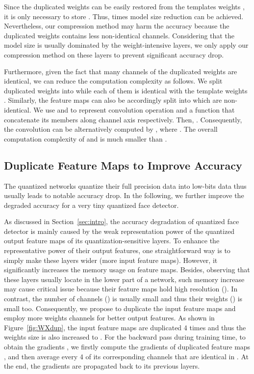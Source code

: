 \documentclass[10pt,twocolumn,letterpaper]{article}
\begin{document}
Since the duplicated weights  can be easily restored from the templates weights , it is only necessary to store . Thus,   times model size reduction can be achieved. Nevertheless, our compression method may harm the accuracy because the duplicated weights contains less non-identical channels. Considering that the model size is usually dominated by the weight-intensive layers, we only apply our compression method on these layers to prevent significant accuracy drop.

Furthermore, given the fact that many channels of the duplicated weights are identical, we can reduce the computation complexity as follows. We split duplicated weights  into  while each of them is identical with the template weights . Similarly, the feature maps  can also be accordingly split into  which are non-identical. We use    and  to represent convolution operation and a function that concatenate its members along channel axis respectively. Then, . Consequently, the convolution  can be alternatively computed by ,  where .  The overall computation complexity of  and  is much smaller than .



\subsection{Duplicate Feature Maps to Improve Accuracy}\label{subSec:Xdup}

The quantized networks quantize their full precision data into low-bits data thus usually leads to notable accuracy drop. In the following, we further improve the degraded accuracy for a very tiny quantized face detector.


As discussed in Section~\ref{sec:intro}, the accuracy degradation of quantized face detector is mainly caused by the weak representation power of the quantized output feature maps of its quantization-sensitive layers. To enhance the representative power of their output features, one straightforward way is to simply make these layers wider (more input feature maps). However, it significantly increases the memory usage on feature maps.  Besides, observing that these layers usually locate in the lower part of a network, such memory increase may cause critical issue because their feature maps hold high resolution (). In contrast, the number of channels () is usually small and thus their weights () is small too. Consequently, we propose to  duplicate the input feature maps and employ more weights channels for better output features. As shown in Figure~\ref{fig:WXdup}, the input feature maps are duplicated 4 times and thus the weights size is also increased to . For the backward pass during training time, to obtain the gradients , we firstly compute the gradients of duplicated feature maps , and then average every 4 of its corresponding channels that are identical in . At the end, the gradients   are propagated back to its previous layers.
\end{document}
